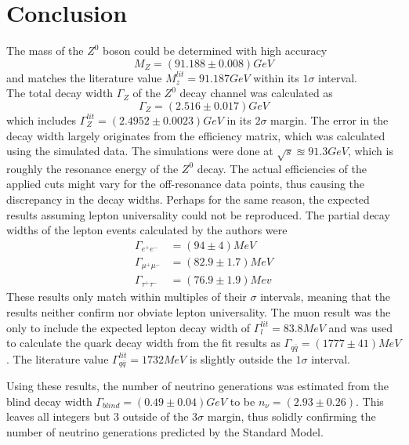 \newpage
\section{Conclusion}
The mass of the $Z^0$ boson could be determined with high accuracy
\begin{equation*}
	M_Z=\unit{(91.188\pm0.008)}{GeV}
\end{equation*}
and matches the literature value $M_z^{lit}=\unit{91.187}{GeV}$ \cite{muenchen} within its $1\sigma$ interval.\\
The total decay width $\Gamma_Z$ of the $Z^0$ decay channel was calculated as
\begin{equation*}
\Gamma_Z=\unit{(2.516\pm0.017)}{GeV}
\end{equation*}
which includes $\Gamma_Z^{lit}=\unit{(2.4952\pm0.0023)}{GeV}$ \cite{jakobs} in its $2\sigma$ margin. The error in the decay width largely originates from the efficiency matrix, which was calculated using the simulated data. The simulations were done at $\sqrt{s}\approxeq\unit{91.3}{GeV}$, which is roughly the resonance energy of the $Z^0$ decay. The actual efficiencies of the applied cuts might vary for the off-resonance data points, thus causing the discrepancy in the decay widths.
Perhaps for the same reason, the expected results assuming lepton universality could not be reproduced. The partial decay widths of the lepton events calculated by the authors were 
\begin{equation*}
\begin{aligned}
\Gamma_{e^+e^-}&=\unit{(94\pm4)}{MeV}\\
\Gamma_{\mu^+\mu^-}&=\unit{(82.9\pm1.7)}{MeV}\\
\Gamma_{\tau^+\tau^-}&=\unit{(76.9\pm1.9)}{Mev}
\end{aligned}
\end{equation*}
These results only match within multiples of their $\sigma$ intervals, meaning that the results neither confirm nor obviate lepton universality. The muon result was the only to include the expected lepton decay width of $\Gamma_l^{lit}=\unit{83.8}{MeV}$ \cite{staatsex} and was used to calculate the quark decay width from the fit results as $\Gamma_{q\overline{q}}=\unit{(1777\pm41)}{MeV}$. The literature value $\Gamma_{q\overline{q}}^{lit}=\unit{1732}{MeV}$ is slightly outside the $1\sigma$ interval.

Using these results, the number of neutrino generations was estimated from the blind decay width $\Gamma_{blind}=\unit{(0.49\pm0.04)}{GeV}$ to be $n_\nu=(2.93\pm0.26)$. This leaves all integers but 3 outside of the $3\sigma$ margin, thus solidly confirming the number of neutrino generations predicted by the Standard Model.